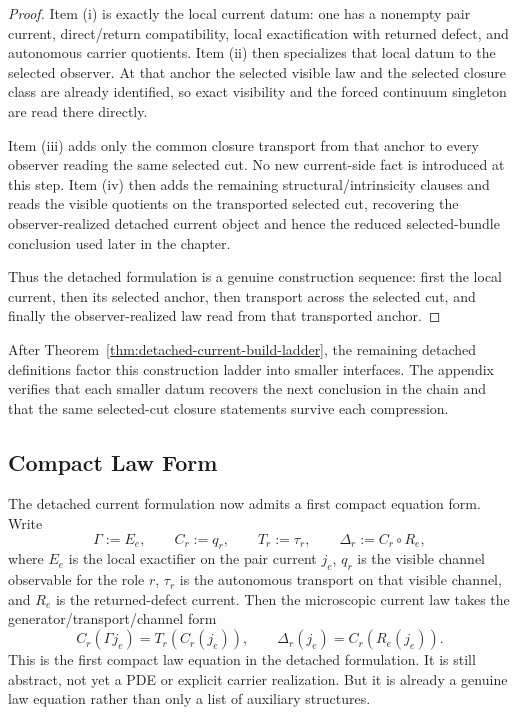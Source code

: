 \begin{proof}
Item (i) is exactly the local current datum: one has a nonempty pair
current, direct/return compatibility, local exactification with returned
defect, and autonomous carrier quotients. Item (ii) then specializes that
local datum to the selected observer. At that anchor the selected
visible law and the selected closure class are already identified, so exact
visibility and the forced continuum singleton are read there directly.

Item (iii) adds only the common closure transport from that anchor to every
observer reading the same selected cut. No new current-side fact is introduced
at this step. Item (iv) then adds the remaining structural/intrinsicity clauses
and reads the visible quotients on the transported selected cut, recovering the
observer-realized detached current object and hence the reduced selected-bundle
conclusion used later in the chapter.

Thus the detached formulation is a genuine construction sequence: first the
local current, then its selected anchor, then transport across the selected
cut, and finally the observer-realized law read from that transported anchor.
\end{proof}

\begin{remark}
After Theorem~\ref{thm:detached-current-build-ladder}, the remaining detached
definitions factor this construction ladder into smaller interfaces. The
appendix verifies that each smaller datum recovers the next conclusion in the
chain and that the same selected-cut closure statements survive each
compression.
\end{remark}

\subsection{Compact Law Form}
\label{sec:detached-current-law-form}

The detached current formulation now admits a first compact equation form.
Write
\[
\Gamma := E_e,
\qquad
C_r := q_r,
\qquad
T_r := \tau_r,
\qquad
\Delta_r := C_r \circ R_e,
\]
where \(E_e\) is the local exactifier on the pair current \(j_e\), \(q_r\) is
the visible channel observable for the role \(r\), \(\tau_r\) is the
autonomous transport on that visible channel, and \(R_e\) is the
returned-defect current. Then the microscopic current law takes the
generator/transport/channel form
\[
C_r(\Gamma j_e)=T_r(C_r(j_e)),
\qquad
\Delta_r(j_e)=C_r(R_e(j_e)).
\]
This is the first compact law equation in the detached formulation. It is
still abstract, not yet a PDE or explicit carrier realization. But it is
already a genuine law equation rather than only a list of auxiliary
structures.

